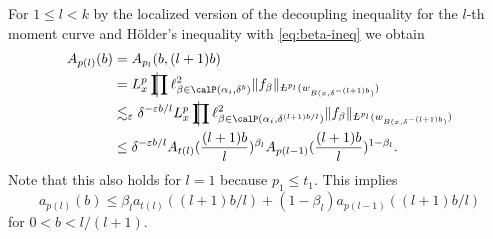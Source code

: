For $1 \leq l < k$ by the localized version of the decoupling inequality for the $l$-th moment curve and H\"older's inequality with \eqref{eq:beta-ineq} we obtain
\begin{equation}
\label{eq:est2}
\begin{split}
A_{p(l)}(b)
&=
A_{p_{l}}(b,(l+1)b)
\\ &=
L^{p}_{x} \avprod \ell^{2}_{\beta \in \Part[\alpha_i]{\delta^{b}}} \norm{f_{\beta}}_{\avL^{p_{l}}(w_{B(x,\delta^{-(l+1)b})})}
\\ &\lesssim_{\epsilon}
\delta^{-\epsilon b/l} L^{p}_{x} \avprod \ell^{2}_{\beta \in \Part[\alpha_i]{\delta^{(l+1)b/l}}} \norm{f_{\beta}}_{\avL^{p_{l}}(w_{B(x,\delta^{-(l+1)b})})}
\\ &\leq
\delta^{-\epsilon b/l}
A_{t(l)}(\frac{(l+1)b}{l})^{\beta_{l}} A_{p(l-1)}(\frac{(l+1)b}{l})^{1-\beta_{l}}.
\end{split}
\end{equation}
Note that this also holds for $l=1$ because $p_{1} \leq t_{1}$.
This implies
\begin{equation}
\label{eq:a*:lower-deg-dec}
a_{p(l)}(b) \leq \beta_{l} a_{t(l)}((l+1)b/l) + (1-\beta_{l}) a_{p(l-1)}((l+1)b/l)
\end{equation}
for $0<b<l/(l+1)$.

